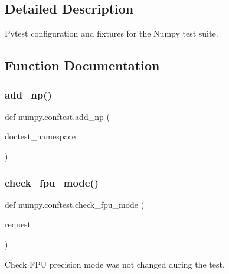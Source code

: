 \subsection{Detailed Description}
\begin{DoxyVerb}Pytest configuration and fixtures for the Numpy test suite.
\end{DoxyVerb}
 

\subsection{Function Documentation}
\mbox{\label{namespacenumpy_1_1conftest_a31e24c9751fbd702394941a8151bbe65}} 
\subsubsection{\texorpdfstring{add\+\_\+np()}{add\_np()}}
{\footnotesize\ttfamily def numpy.\+conftest.\+add\+\_\+np (\begin{DoxyParamCaption}\item[{}]{doctest\+\_\+namespace }\end{DoxyParamCaption})}

\mbox{\label{namespacenumpy_1_1conftest_abb3c8c424f98ed8e38dc510c5ed7aaef}} 
\subsubsection{\texorpdfstring{check\+\_\+fpu\+\_\+mode()}{check\_fpu\_mode()}}
{\footnotesize\ttfamily def numpy.\+conftest.\+check\+\_\+fpu\+\_\+mode (\begin{DoxyParamCaption}\item[{}]{request }\end{DoxyParamCaption})}

\begin{DoxyVerb}Check FPU precision mode was not changed during the test.
\end{DoxyVerb}
 \mbox{\label{namespacenumpy_1_1conftest_a99b17d9fba18dff1cb7e67fea1a65ce0}} 

